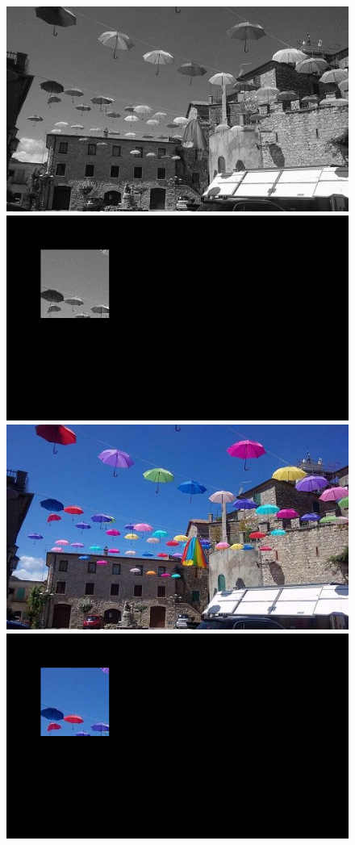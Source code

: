 \documentclass{article}
\begin{document}
	\begin{figure}[!ht]	
	\centering	
	\includegraphics{img/gray-obraz1}	
	\includegraphics{img/geometryczne/kopiowanie-gray}
	\includegraphics{img/rgb-obraz1}	
	\includegraphics{img/geometryczne/kopiowanie-rgb}

\end{figure}
\end{document}
